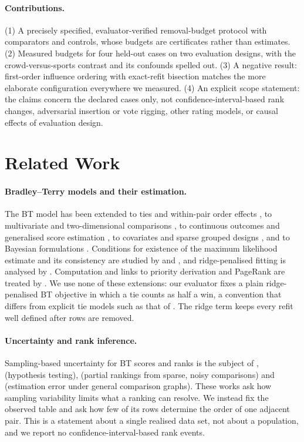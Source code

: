 \documentclass{article}
\begin{document}
\paragraph{Contributions.} (1) A precisely specified, evaluator-verified removal-budget protocol with comparators and controls, whose budgets are certificates rather than estimates. (2) Measured budgets for four held-out cases on two evaluation designs, with the crowd-versus-sports contrast and its confounds spelled out. (3) A negative result: first-order influence ordering with exact-refit bisection matches the more elaborate configuration everywhere we measured. (4) An explicit scope statement: the claims concern the declared cases only, not confidence-interval-based rank changes, adversarial insertion or vote rigging, other rating models, or causal effects of evaluation design.

\section{Related Work}
\paragraph{Bradley--Terry models and their estimation.} The BT model has been extended to ties and within-pair order effects \citep{Davidson1970OnET,Davidson1977OnET}, to multivariate and two-dimensional comparisons \citep{Davidson1969MultivariatePC,Causeur2005A2E}, to continuous outcomes and generalised score estimation \citep{Stern2011ModeratedPC,Fageot2023GeneralizedBM}, to covariates and sparse grouped designs \citep{Yan2025InferenceIA,Yan2011GROUPEDSP}, and to Bayesian formulations \citep{Leonard1977AnAB,Hussain2013BayesianIO,Rizvi2026BayesianBF}. Conditions for existence of the maximum likelihood estimate and its consistency are studied by \citet{Butler2004TheEO} and \citet{Bong2021GeneralizedRF}, and ridge-penalised fitting is analysed by \citet{Varin2024TractableRR}. Computation and links to priority derivation and PageRank are treated by \citet{Vojnović2019ConvergenceRO,Sawadogo2019CombiningMA,Genest1999DerivingPF,Selby2024PageRankAT}. We use none of these extensions: our evaluator fixes a plain ridge-penalised BT objective in which a tie counts as half a win, a convention that differs from explicit tie models such as that of \citet{Davidson1970OnET}. The ridge term keeps every refit well defined after rows are removed.

\paragraph{Uncertainty and rank inference.} Sampling-based uncertainty for BT scores and ranks is the subject of \citet{Gao2021UncertaintyQI}, \citet{Makur2024MinimaxHT} (hypothesis testing), \citet{Morel-Balbi2025EstimationOP} (partial rankings from sparse, noisy comparisons) and \citet{Li2021ThePO} (estimation error under general comparison graphs). These works ask how sampling variability limits what a ranking can resolve. We instead fix the observed table and ask how few of its rows determine the order of one adjacent pair. This is a statement about a single realised data set, not about a population, and we report no confidence-interval-based rank events.
\end{document}
